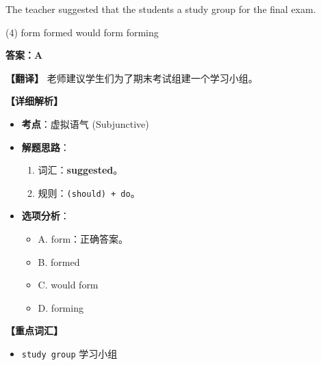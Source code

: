 \documentclass[11pt, a4paper]{article}
\newcommand{\analysis}[4]{
    \begin{solutionbox}
        \textbf{答案：#1}
        
        \textbf{【翻译】} #2
        
        \textbf{【详细解析】}
        #3
        
        \textbf{【重点词汇】}
        #4
    \end{solutionbox}
}
\newcommand{\blank}{\underline{\hspace{1.5cm}}}
\begin{document}
\begin{questions}
    \item The teacher suggested that the students \blank a study group for the final exam.
    \begin{tasks}(4)
        \task form \task formed \task would form \task forming
    \end{tasks}
    \analysis{A}{老师建议学生们为了期末考试组建一个学习小组。}{
        \begin{itemize}
            \item \textbf{考点}：虚拟语气 (Subjunctive)
            \item \textbf{解题思路}：
                \begin{enumerate}
                    \item 词汇：\textbf{suggested}。
                    \item 规则：\texttt{(should) + do}。
                \end{enumerate}
            \item \textbf{选项分析}：
                \begin{itemize}
                    \item A. form：正确答案。
                    \item B. formed
                    \item C. would form
                    \item D. forming
                \end{itemize}
        \end{itemize}
    }{
        \begin{itemize}
            \item \texttt{study group} 学习小组
        \end{itemize}
    }


\end{questions}
\end{document}

